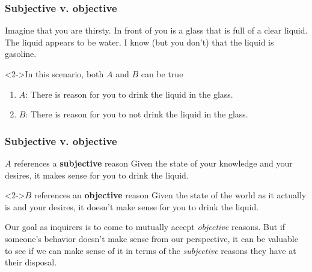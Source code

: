 \frametitle{Subjective v. objective}

Imagine that you are thirsty.  In front of you is a glass that is full of a clear liquid.  The liquid appears to be water. I know (but you don't) that the liquid is gasoline.

\begin{block}<2->{In this scenario, both $A$ and $B$ can be true}
  \begin{enumerate}[$\rightharpoonup$]
    \item $A$: There is reason for you to drink the liquid in the glass.
    \item $B$: There is reason for you to not drink the liquid in the glass.
  \end{enumerate}
\end{block}

\begin{frame}
\frametitle{Subjective v. objective}

\begin{block}{$A$ references a \textbf{subjective} reason}
  Given the state of your knowledge and your desires, it makes sense for you to drink the liquid.
\end{block}

\begin{block}<2->{$B$ references an \textbf{objective} reason}
  Given the state of the world as it actually is and your desires, it doesn't make sense for you to drink the liquid.
\end{block}

Our goal as inquirers is to come to mutually accept \textit{objective} reasons.  But if someone's behavior doesn't make sense from our perspective, it can be valuable to see if we can make sense of it in terms of the \textit{subjective} reasons they have at their disposal.

\end{frame}
